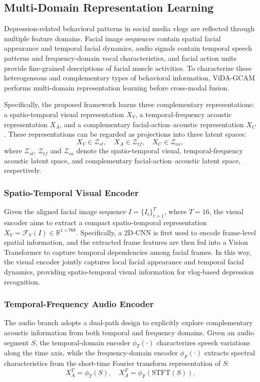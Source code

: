 \documentclass[a4paper,fleqn]{cas-dc}
\begin{document}
\subsection{Multi-Domain Representation Learning}
Depression-related behavioral patterns in social media vlogs are reflected through multiple feature domains. Facial image sequences contain spatial facial appearance and temporal facial dynamics, audio signals contain temporal speech patterns and frequency-domain vocal characteristics, and facial action units provide fine-grained descriptions of facial muscle activities. To characterize these heterogeneous and complementary types of behavioral information, ViDA-GCAM performs multi-domain representation learning before cross-modal fusion.

Specifically, the proposed framework learns three complementary representations: a spatio-temporal visual representation $X_V$, a temporal-frequency acoustic representation $X_A$, and a complementary facial-action–acoustic representation $X_C$. These representations can be regarded as projections into three latent spaces:
\begin{equation}
X_V \in \mathcal{Z}_{st}, \quad
X_A \in \mathcal{Z}_{tf}, \quad
X_C \in \mathcal{Z}_{ca},
\end{equation}
where $\mathcal{Z}_{st}$,  $\mathcal{Z}_{tf}$ and $\mathcal{Z}_{ca}$ denote the spatio-temporal visual, temporal-frequency acoustic latent space, and complementary facial-action–acoustic latent space, respectively.



\subsubsection{Spatio-Temporal Visual Encoder}
Given the aligned facial image sequence $I=\{I_t\}_{t=1}^{T}$, where $T=16$, the visual encoder aims to extract a compact spatio-temporal representation $X_V=\mathcal{F}_V(I)\in\mathbb{R}^{1\times 768}$. Specifically, a 2D-CNN is first used to encode frame-level spatial information, and the extracted frame features are then fed into a Vision Transformer to capture temporal dependencies among facial frames. In this way, the visual encoder jointly captures local facial appearance and temporal facial dynamics, providing spatio-temporal visual information for vlog-based depression recognition.



\subsubsection{Temporal-Frequency Audio Encoder}
The audio branch adopts a dual-path design to explicitly explore complementary acoustic information from both temporal and frequency domains. Given an audio segment $S$, the temporal-domain encoder $\phi_T(\cdot)$ characterizes speech variations along the time axis, while the frequency-domain encoder $\phi_F(\cdot)$ extracts spectral characteristics from the short-time Fourier transform representation of $S$:
\begin{equation}
X_A^T = \phi_T(S), \quad X_A^F = \phi_F(\mathrm{STFT}(S)).
\end{equation}
\end{document}
